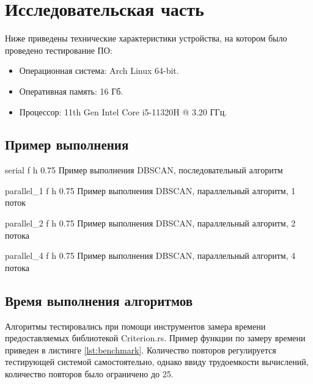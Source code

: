 \chapter{Исследовательская часть}
Ниже приведены технические характеристики устройства, на котором было проведено тестирование ПО:

\begin{itemize}
    \item Операционная система: Arch Linux \cite{arch} 64-bit.
    \item Оперативная память: 16 Гб.
    \item Процессор: 11th Gen Intel\textsuperscript{\tiny\textregistered} Core\textsuperscript{\tiny\texttrademark} i5-11320H @ 3.20 ГГц\cite{i5}.
\end{itemize}

\section{Пример выполнения}
{serial} %
{f} %
{h} %
{0.75\textwidth} %
{Пример выполнения DBSCAN, последовательный алгоритм} %

{parallel_1} %
{f} %
{h} %
{0.75\textwidth} %
{Пример выполнения DBSCAN, параллельный алгоритм, 1 поток} %

{parallel_2} %
{f} %
{h} %
{0.75\textwidth} %
{Пример выполнения DBSCAN, параллельный алгоритм, 2 потока} %


{parallel_4} %
{f} %
{h} %
{0.75\textwidth} %
{Пример выполнения DBSCAN, параллельный алгоритм, 4 потока} %

\clearpage

\section{Время выполнения алгоритмов}
Алгоритмы тестировались при помощи инструментов замера времени предоставляемых библиотекой Criterion.rs\cite{Criterion}.
Пример функции по замеру времени приведен в листинге \ref{lst:benchmark}.
Количество повторов регулируется тестирующей системой самостоятельно, однако ввиду трудоемкости вычислений, количество повторов было ограничено до 25.


